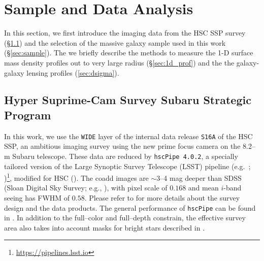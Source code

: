 \documentclass[a4paper,fleqn,usenatbib]{mnras}
\begin{document}
\section{Sample and Data Analysis}
    \label{sec:data}

    In this section, we first introduce the imaging data from the HSC SSP survey
    (\S \ref{sec:hsc}) and the selection of the massive galaxy sample used in this work 
    (\S \ref{sec:sample}).
    The we briefly describe the methods to measure the 1-D surface mass density profiles 
    out to very large radius (\S \ref{sec:1d_prof}) and the the galaxy-galaxy lensing \dsigma{} 
    profiles (\ref{sec:dsigma}).


\subsection{Hyper Suprime-Cam Survey Subaru Strategic Program}

    \label{sec:hsc}



	In this work, we use the \texttt{WIDE} layer of the internal data release
	\texttt{S16A} of the HSC SSP, an ambitious imaging survey using the new prime focus
	camera on the 8.2--m Subaru telescope.
	These data are reduced by \texttt{hscPipe 4.0.2}, a specially tailored version of
	the Large Synoptic Survey Telescope (LSST) pipeline (e.g.\ \citealt{Juric2015};
	\citealt{Axelrod2010})\footnote{\url{https://pipelines.lsst.io}},
	modified for HSC (\citealt{HSC-PIPE}).
	The coadd images are $\sim$3--4 mag deeper than SDSS (Sloan Digital Sky Survey;
	e.g., \citealt{SDSS-DR7, SDSS-DR8, SDSS-DR12}), with pixel scale of 0\asec{}$.168$
	and mean $i$-band seeing has FWHM of 0\asec{}$.58$.
	Please refer to \citet{HSC-SSP, HSC-DR1} for more details about the survey design
	and the data products.
	The general performance of \texttt{hscPipe} can be found in \citet{SynPipe}.
	In addition to the full--color and full--depth constrain, the effective survey
	area also takes into account masks for bright stars described in
	\citet{HSC-STAR}.
\end{document}
